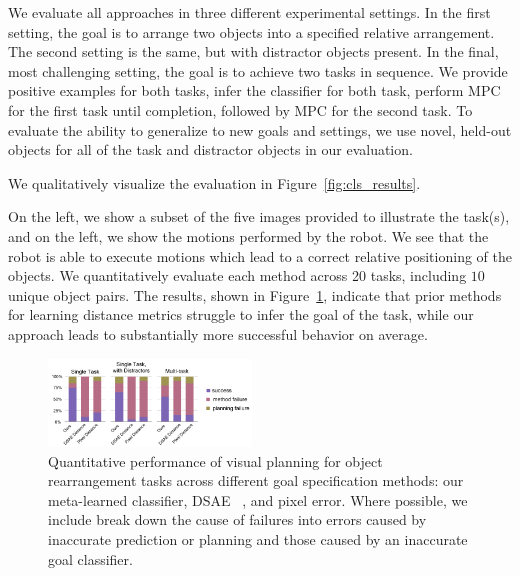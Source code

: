 We evaluate all approaches in three different experimental settings. In the first setting, the goal is to arrange two objects into a specified relative arrangement. The second setting is the same, but with distractor objects present. In the final, most challenging setting, the goal is to achieve two tasks in sequence. We provide positive examples for both tasks, infer the classifier for both task, perform MPC for the first task until completion, followed by MPC for the second task. To evaluate the ability to generalize to new goals and settings, we use novel, held-out objects for all of the task and distractor objects in our evaluation. 

We qualitatively visualize the evaluation in Figure~\ref{fig:cls_results}.

On the left, we show a subset of the five images provided to illustrate the task(s), and on the left, we show the motions performed by the robot. We see that the robot is able to execute motions which lead to a correct relative positioning of the objects.
We quantitatively evaluate each method across 20 tasks, including $10$ unique object pairs. The results, shown in Figure~\ref{fig:cls_charts}, indicate that prior methods for learning distance metrics
struggle to infer the goal of the task, while our approach leads to substantially more successful behavior on average. 



\begin{figure}
    \centering
    \includegraphics[width=0.48\textwidth]{images_cls/cls_charts.jpeg}
    \caption{\small Quantitative performance of visual planning for object rearrangement tasks across different goal specification methods: our meta-learned classifier, DSAE~\cite{finn_nips} , and pixel error. Where possible, we include break down the cause of failures into errors caused by inaccurate prediction or planning and those caused by an inaccurate goal classifier.}
    \label{fig:cls_charts}
    \vspace{-0.3cm}
\end{figure}


